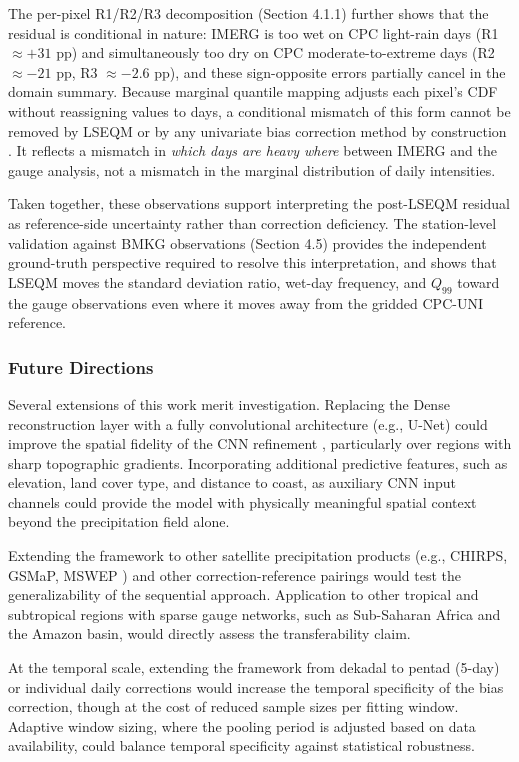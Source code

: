 \documentclass[11pt,a4paper]{article}
\begin{document}
The per-pixel R1/R2/R3 decomposition (Section 4.1.1) further shows that
the residual is conditional in nature: IMERG is too wet on CPC
light-rain days (R1 \(\approx +31\) pp) and simultaneously too dry on
CPC moderate-to-extreme days (R2 \(\approx -21\) pp, R3 \(\approx -2.6\)
pp), and these sign-opposite errors partially cancel in the domain
summary. Because marginal quantile mapping adjusts each pixel's CDF
without reassigning values to days, a conditional mismatch of this form
cannot be removed by LSEQM or by any univariate bias correction method
by construction \cite{ref34,ref11}. It reflects a mismatch in \emph{which days
are heavy where} between IMERG and the gauge analysis, not a mismatch in
the marginal distribution of daily intensities.

Taken together, these observations support interpreting the post-LSEQM
residual as reference-side uncertainty rather than correction
deficiency. The station-level validation against BMKG observations
(Section 4.5) provides the independent ground-truth perspective required
to resolve this interpretation, and shows that LSEQM moves the standard
deviation ratio, wet-day frequency, and \(Q_{99}\) toward the gauge
observations even where it moves away from the gridded CPC-UNI
reference.

\subsubsection{Future Directions}\label{future-directions}

Several extensions of this work merit investigation. Replacing the Dense
reconstruction layer with a fully convolutional architecture (e.g.,
U-Net) could improve the spatial fidelity of the CNN refinement
\cite{ref40,ref41}, particularly over regions with sharp topographic gradients.
Incorporating additional predictive features, such as elevation, land
cover type, and distance to coast, as auxiliary CNN input channels could
provide the model with physically meaningful spatial context beyond the
precipitation field alone.

Extending the framework to other satellite precipitation products (e.g.,
CHIRPS, GSMaP, MSWEP \cite{ref42}) and other correction-reference pairings
would test the generalizability of the sequential approach. Application
to other tropical and subtropical regions with sparse gauge networks,
such as Sub-Saharan Africa and the Amazon basin, would directly assess
the transferability claim.

At the temporal scale, extending the framework from dekadal to pentad
(5-day) or individual daily corrections would increase the temporal
specificity of the bias correction, though at the cost of reduced sample
sizes per fitting window. Adaptive window sizing, where the pooling
period is adjusted based on data availability, could balance temporal
specificity against statistical robustness.
\end{document}
